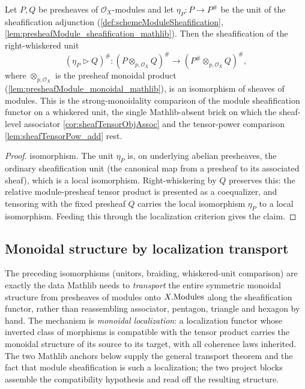 \begin{lemma}\leanok
  \label{lem:isIso_sheafification_whiskerRight_unit}
  Let \(P, Q\) be presheaves of \(\mathcal{O}_X\)-modules and let
  \(\eta_P : P \to P^{\#}\) be the unit of the sheafification adjunction
  (\cref{def:schemeModuleSheafification},
  \cref{lem:presheafModule_sheafification_mathlib}). Then the sheafification of the
  right-whiskered unit
  \[
    (\eta_P \rhd Q)^{\#} :
      (P \otimes_{p,\mathcal{O}_X} Q)^{\#} \longrightarrow
      (P^{\#} \otimes_{p,\mathcal{O}_X} Q)^{\#},
  \]
  where \(\otimes_{p,\mathcal{O}_X}\) is the presheaf monoidal product
  (\cref{lem:presheafModule_monoidal_mathlib}), is an isomorphism of sheaves of
  modules. This is the strong-monoidality comparison of the module sheafification
  functor on a whiskered unit, the single Mathlib-absent brick on which the
  sheaf-level associator \cref{cor:sheafTensorObjAssoc} and the tensor-power
  comparison \cref{lem:sheafTensorPow_add} rest.
\end{lemma}

\begin{proof}
  \leanok
  isomorphism. The unit \(\eta_P\) is, on underlying abelian presheaves, the
  ordinary sheafification unit (the canonical map from a presheaf to its associated sheaf), which is a local
  isomorphism. Right-whiskering by \(Q\) preserves this: the relative
  module-presheaf tensor product is presented as a coequalizer, and tensoring with
  the fixed presheaf \(Q\) carries the local isomorphism \(\eta_P\) to a local
  isomorphism. Feeding this through the localization criterion gives the claim.
\end{proof}

\subsection{Monoidal structure by localization transport}
\label{subsec:sgr_monoidal_localization}

The preceding isomorphisms (unitors, braiding, whiskered-unit comparison) are
exactly the data Mathlib needs to \emph{transport} the entire symmetric monoidal
structure from presheaves of modules onto \(X.\mathrm{Modules}\) along the sheafification
functor, rather than reassembling associator, pentagon, triangle and hexagon by
hand. The mechanism is \emph{monoidal localization}: a localization functor whose
inverted class of morphisms is compatible with the tensor product carries the
monoidal structure of its source to its target, with all coherence laws inherited.
The two Mathlib anchors below supply the general transport theorem and the fact
that module sheafification is such a localization; the two project blocks assemble
the compatibility hypothesis and read off the resulting structure.

